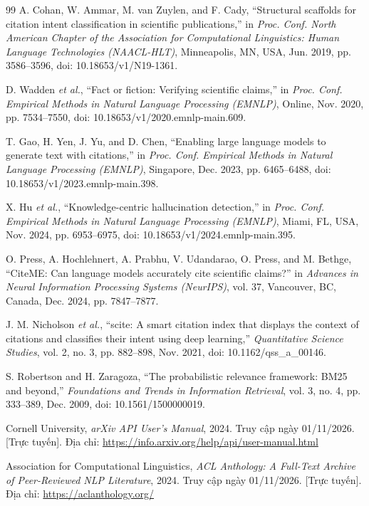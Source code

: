 \begin{thebibliography}{99}
A. Cohan, W. Ammar, M. van Zuylen, and F. Cady, ``Structural scaffolds for citation intent classification in scientific publications,'' in \textit{Proc. Conf. North American Chapter of the Association for Computational Linguistics: Human Language Technologies (NAACL-HLT)}, Minneapolis, MN, USA, Jun. 2019, pp. 3586--3596, doi: 10.18653/v1/N19-1361.

D. Wadden \textit{et al.}, ``Fact or fiction: Verifying scientific claims,'' in \textit{Proc. Conf. Empirical Methods in Natural Language Processing (EMNLP)}, Online, Nov. 2020, pp. 7534--7550, doi: 10.18653/v1/2020.emnlp-main.609.

T. Gao, H. Yen, J. Yu, and D. Chen, ``Enabling large language models to generate text with citations,'' in \textit{Proc. Conf. Empirical Methods in Natural Language Processing (EMNLP)}, Singapore, Dec. 2023, pp. 6465--6488, doi: 10.18653/v1/2023.emnlp-main.398.

X. Hu \textit{et al.}, ``Knowledge-centric hallucination detection,'' in \textit{Proc. Conf. Empirical Methods in Natural Language Processing (EMNLP)}, Miami, FL, USA, Nov. 2024, pp. 6953--6975, doi: 10.18653/v1/2024.emnlp-main.395.

O. Press, A. Hochlehnert, A. Prabhu, V. Udandarao, O. Press, and M. Bethge, ``CiteME: Can language models accurately cite scientific claims?'' in \textit{Advances in Neural Information Processing Systems (NeurIPS)}, vol. 37, Vancouver, BC, Canada, Dec. 2024, pp. 7847--7877.

J. M. Nicholson \textit{et al.}, ``scite: A smart citation index that displays the context of citations and classifies their intent using deep learning,'' \textit{Quantitative Science Studies}, vol. 2, no. 3, pp. 882--898, Nov. 2021, doi: 10.1162/qss\_a\_00146.

S. Robertson and H. Zaragoza, ``The probabilistic relevance framework: BM25 and beyond,'' \textit{Foundations and Trends in Information Retrieval}, vol. 3, no. 4, pp. 333--389, Dec. 2009, doi: 10.1561/1500000019.

Cornell University, \textit{arXiv API User's Manual}, 2024. Truy cập ngày 01/11/2026. [Trực tuyến]. Địa chỉ: \url{https://info.arxiv.org/help/api/user-manual.html}

Association for Computational Linguistics, \textit{ACL Anthology: A Full-Text Archive of Peer-Reviewed NLP Literature}, 2024. Truy cập ngày 01/11/2026. [Trực tuyến]. Địa chỉ: \url{https://aclanthology.org/}


\end{thebibliography}
